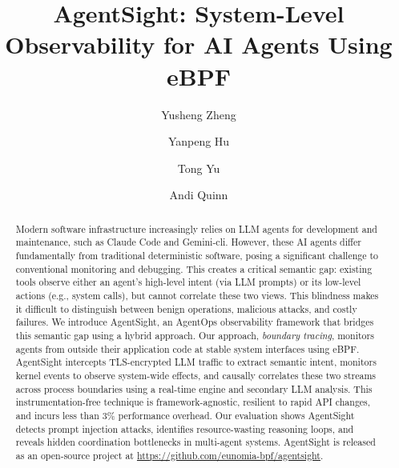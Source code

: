 \documentclass[sigconf,10pt]{acmart}
\begin{document}

\title{AgentSight: System-Level Observability for AI Agents Using eBPF}

    
\author{Yusheng Zheng}

\author{Yanpeng Hu}

\author{Tong Yu}

\author{Andi Quinn}


\sloppy
\begin{abstract}
    Modern software infrastructure increasingly relies on LLM agents for development and maintenance, such as Claude Code and Gemini-cli. However, these AI agents differ fundamentally from traditional deterministic software, posing a significant challenge to conventional monitoring and debugging. This creates a critical semantic gap: existing tools observe either an agent's high-level intent (via LLM prompts) or its low-level actions (e.g., system calls), but cannot correlate these two views. This blindness makes it difficult to distinguish between benign operations, malicious attacks, and costly failures. We introduce AgentSight, an AgentOps observability framework that bridges this semantic gap using a hybrid approach. Our approach, \emph{boundary tracing}, monitors agents from outside their application code at stable system interfaces using eBPF. AgentSight intercepts TLS-encrypted LLM traffic to extract semantic intent, monitors kernel events to observe system-wide effects, and causally correlates these two streams across process boundaries using a real-time engine and secondary LLM analysis. This instrumentation-free technique is framework-agnostic, resilient to rapid API changes, and incurs less than 3\% performance overhead. Our evaluation shows AgentSight detects prompt injection attacks, identifies resource-wasting reasoning loops, and reveals hidden coordination bottlenecks in multi-agent systems. AgentSight is released as an open-source project at \url{https://github.com/eunomia-bpf/agentsight}.
\end{abstract}
\end{document}
